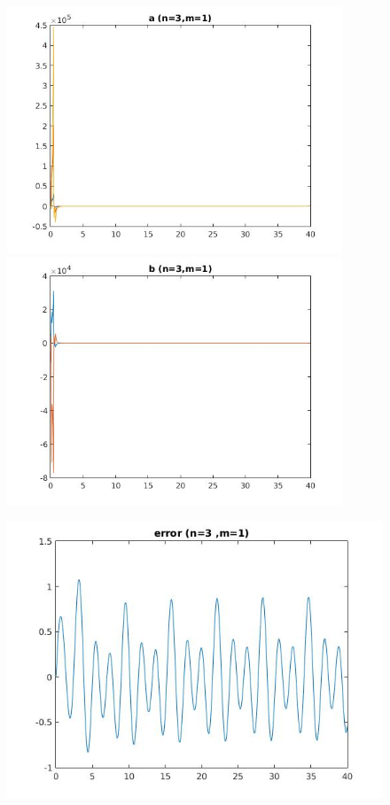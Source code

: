 \documentclass{article}
\begin{document}
\clearpage
\large
\begin{figure}[h!]
\centering 
 	  \begin{minipage}{0.48\textwidth}
     \centering
     \advance\leftskip-4cm
  \includegraphics[width=100mm,scale=2]{assets/try31o.jpg}
   \end{minipage} \hfill
    \begin{minipage}{0.48\textwidth}
  \includegraphics[width=100mm,scale=2]{assets/try31oo.jpg}
  \end{minipage}
\end{figure}
\begin{figure}[h!]
\centering
\advance\leftskip-0.5cm
 \includegraphics[width=130mm,scale=2]{assets/try31ooo.jpg}
\end{figure}
\end{document}
